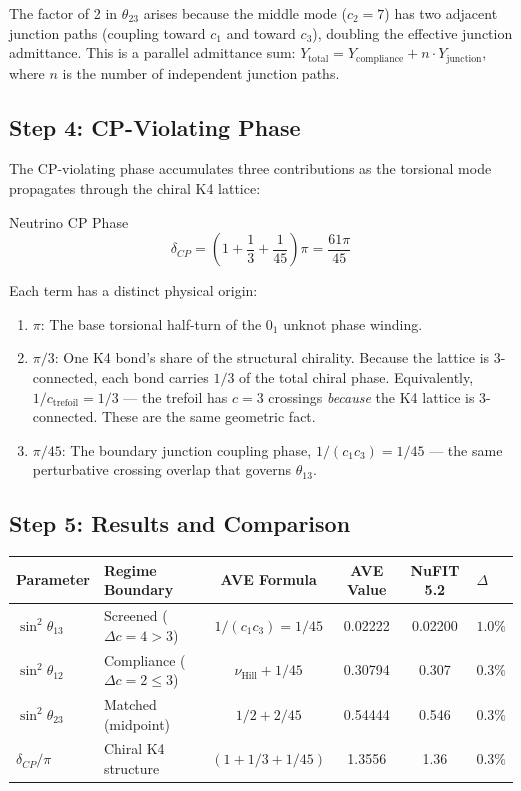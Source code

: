 \noindent
The factor of 2 in $\theta_{23}$ arises because the middle mode ($c_2 = 7$) has two adjacent junction paths (coupling toward $c_1$ and toward $c_3$), doubling the effective junction admittance. This is a parallel admittance sum: $Y_{\text{total}} = Y_{\text{compliance}} + n \cdot Y_{\text{junction}}$, where $n$ is the number of independent junction paths.

\subsection{Step 4: CP-Violating Phase}
\label{sec:delta_cp}

The CP-violating phase accumulates three contributions as the torsional mode propagates through the chiral K4 lattice:
\begin{resultbox}{Neutrino CP Phase}
\begin{equation}
    \delta_{CP} = \left(1 + \frac{1}{3} + \frac{1}{45}\right)\pi = \frac{61\pi}{45}
    \label{eq:delta_cp_pmns}
\end{equation}
\end{resultbox}

\noindent
Each term has a distinct physical origin:
\begin{enumerate}
    \item $\pi$: The base torsional half-turn of the $0_1$ unknot phase winding.
    \item $\pi/3$: One K4 bond's share of the structural chirality. Because the lattice is 3-connected, each bond carries $1/3$ of the total chiral phase. Equivalently, $1/c_{\text{trefoil}} = 1/3$ --- the trefoil has $c = 3$ crossings \textit{because} the K4 lattice is 3-connected. These are the same geometric fact.
    \item $\pi/45$: The boundary junction coupling phase, $1/(c_1 c_3) = 1/45$ --- the same perturbative crossing overlap that governs $\theta_{13}$.
\end{enumerate}

\subsection{Step 5: Results and Comparison}

\begin{center}
\small
\renewcommand{\arraystretch}{1.2}
\begin{tabular}{llcccl}
\toprule
\textbf{Parameter} & \textbf{Regime Boundary} & \textbf{AVE Formula} & \textbf{AVE Value} & \textbf{NuFIT 5.2} & \textbf{$\Delta$} \\
\midrule
$\sin^2\theta_{13}$ & Screened ($\Delta c = 4 > 3$) & $1/(c_1 c_3) = 1/45$ & 0.02222 & 0.02200 & $1.0\%$ \\
$\sin^2\theta_{12}$ & Compliance ($\Delta c = 2 \le 3$) & $\nu_{\text{Hill}} + 1/45$ & 0.30794 & 0.307 & $0.3\%$ \\
$\sin^2\theta_{23}$ & Matched (midpoint) & $1/2 + 2/45$ & 0.54444 & 0.546 & $0.3\%$ \\
$\delta_{CP}/\pi$   & Chiral K4 structure & $(1 + 1/3 + 1/45)$ & 1.3556 & 1.36 & $0.3\%$ \\
\bottomrule
\end{tabular}
\end{center}

